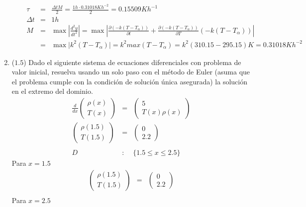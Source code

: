 \documentclass[12pt]{article}
\newcommand{\diffl}[3]{\frac{d^{#3}}{d#2^{#3}}#1}
\begin{document}
\begin{enumerate}[leftmargin=*,widest=9]
\begin{enumerate}[label=\alph*]
\begin{eqnarray*}
   \tau &=& \frac{\Delta tM}{2} = \frac{1h\cdot 0.31018Kh^{-2}}{2} = 0.15509Kh^{-1} \\ \Delta t &=& 1h \\ M &=& \max \left\vert \frac{d^2 y}{dt^2}\right\vert = \max \left\vert \frac{\partial (-k(T-T_{\alpha}))}{\partial t} +\frac{\partial (-k(T-T_{\alpha}))}{\partial T} (-k(T-T_{\alpha}))\right\vert \\  &=& \max \vert  k^2 (T -T_{\alpha} )\vert = k^2 max (T -T_{\alpha}) = k^2 (310.15-295.15)K = 0.31018Kh^{-2}
   \end{eqnarray*}
    \end{enumerate}
    \item (\(1.5\)) Dado el siguiente sistema de ecuaciones diferenciales con problema de valor inicial, resuelva usando un solo paso con el método de Euler (asuma que el problema cumple con la condición de solución única asegurada) la solución en el extremo del dominio.
    \begin{eqnarray*}
    \diffl{
		\begin{pmatrix}
			\rho(x) \\ T(x)
		\end{pmatrix}
    }{x}{} &=& \begin{pmatrix}
    5 \\ T(x)\rho(x)
    \end{pmatrix} \\
    \begin{pmatrix}
    \rho(1.5) \\ T(1.5)
    \end{pmatrix} &=& \begin{pmatrix}
    0 \\ 2.2
    \end{pmatrix} \\
    \\
    D &:& \lbrace 1.5 \leq x \leq 2.5 \rbrace
    \end{eqnarray*}
    Para $x= 1.5$
    \begin{eqnarray*}
    	\begin{pmatrix}
			\rho(1.5) \\ T(1.5)
		\end{pmatrix}
     &=& \begin{pmatrix}
    0 \\ 2.2
    \end{pmatrix} \\
    \end{eqnarray*}
    Para $x= 2.5$
    \begin{eqnarray*}

\end{eqnarray*}
\end{enumerate}
\end{document}
